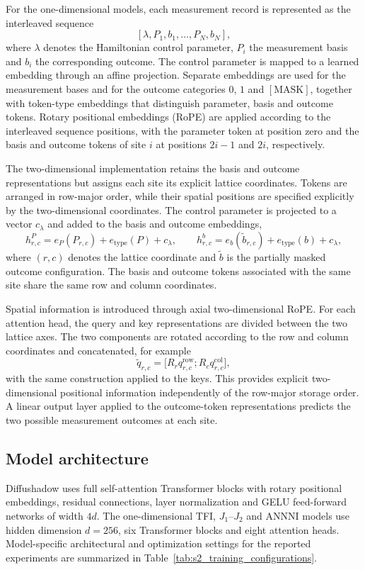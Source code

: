 \documentclass[11pt,a4paper]{article}
\newcommand{\subhead}[1]{\subsection*{#1}}
\begin{document}
For the one-dimensional models, each measurement record is represented
as the interleaved sequence
\[
[\lambda,P_1,b_1,\ldots,P_N,b_N],
\]
where $\lambda$ denotes the Hamiltonian control parameter, $P_i$ the
measurement basis and $b_i$ the corresponding outcome. The control
parameter is mapped to a learned embedding through an affine projection.
Separate embeddings are used for the measurement bases and for the
outcome categories $0$, $1$ and $[\mathrm{MASK}]$, together with
token-type embeddings that distinguish parameter, basis and outcome
tokens. Rotary positional embeddings (RoPE) are applied according to
the interleaved sequence positions, with the parameter token at
position zero and the basis and outcome tokens of site $i$ at positions
$2i-1$ and $2i$, respectively.

The two-dimensional implementation retains the basis and outcome
representations but assigns each site its explicit lattice coordinates.
Tokens are arranged in row-major order, while their spatial positions are specified explicitly by the two-dimensional coordinates. The
control parameter is projected to a vector $c_\lambda$ and added to
the basis and outcome embeddings,
\[
h^{P}_{r,c}
=
e_P(P_{r,c})+e_{\mathrm{type}}(P)+c_\lambda,
\qquad
h^{b}_{r,c}
=
e_b(\widetilde b_{r,c})+e_{\mathrm{type}}(b)+c_\lambda,
\]
where $(r,c)$ denotes the lattice coordinate and $\widetilde b$ is the
partially masked outcome configuration. The basis and outcome tokens
associated with the same site share the same row and column
coordinates.

Spatial information is introduced through axial two-dimensional RoPE.
For each attention head, the query and key representations are divided
between the two lattice axes. The two components are rotated according
to the row and column coordinates and concatenated, for example
\[
\widetilde q_{r,c}
=
\bigl[
R_r q^{\mathrm{row}}_{r,c};
R_c q^{\mathrm{col}}_{r,c}
\bigr],
\]
with the same construction applied to the keys. This provides explicit
two-dimensional positional information independently of the row-major
storage order. A linear output layer applied to the outcome-token
representations predicts the two possible measurement outcomes at each
site.

\subhead{Model architecture}

Diffushadow uses full self-attention Transformer blocks with rotary
positional embeddings, residual connections, layer normalization and
GELU feed-forward networks of width $4d$. The one-dimensional TFI,
$J_1$--$J_2$ and ANNNI models use hidden dimension $d=256$, six
Transformer blocks and eight attention heads. Model-specific
architectural and optimization settings for the reported experiments
are summarized in Table~\ref{tab:s2_training_configurations}.
\end{document}
